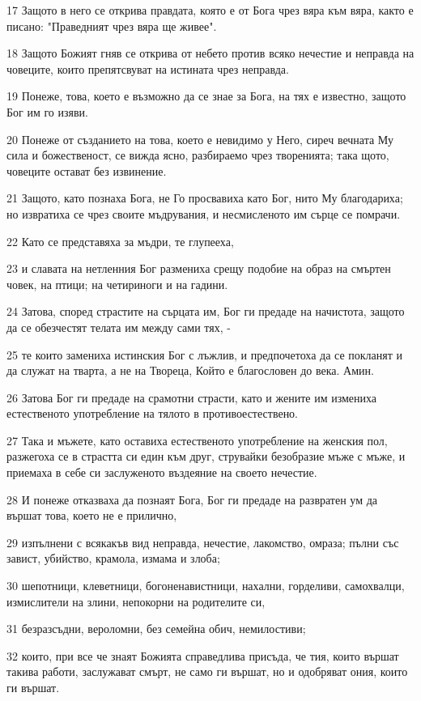 \par 17 Защото в него се открива правдата, която е от Бога чрез вяра към вяра, както е писано: "Праведният чрез вяра ще живее".
\par 18 Защото Божият гняв се открива от небето против всяко нечестие и неправда на човеците, които препятсвуват на истината чрез неправда.
\par 19 Понеже, това, което е възможно да се знае за Бога, на тях е известно, защото Бог им го изяви.
\par 20 Понеже от създанието на това, което е невидимо у Него, сиреч вечната Му сила и божественост, се вижда ясно, разбираемо чрез творенията; така щото, човеците остават без извинение.
\par 21 Защото, като познаха Бога, не Го просвавиха като Бог, нито Му благодариха; но извратиха се чрез своите мъдрувания, и несмисленото им сърце се помрачи.
\par 22 Като се представяха за мъдри, те глупееха,
\par 23 и славата на нетленния Бог размениха срещу подобие на образ на смъртен човек, на птици; на четириноги и на гадини.
\par 24 Затова, според страстите на сърцата им, Бог ги предаде на начистота, защото да се обезчестят телата им между сами тях, -
\par 25 те които замениха истинския Бог с лъжлив, и предпочетоха да се покланят и да служат на тварта, а не на Твореца, Който е благословен до века. Амин.
\par 26 Затова Бог ги предаде на срамотни страсти, като и жените им измениха естественото употребление на тялото в противоестествено.
\par 27 Така и мъжете, като оставиха естественото употребление на женския пол, разжегоха се в страстта си един към друг, струвайки безобразие мъже с мъже, и приемаха в себе си заслуженото въздеяние на своето нечестие.
\par 28 И понеже отказваха да познаят Бога, Бог ги предаде на развратен ум да вършат това, което не е прилично,
\par 29 изпълнени с всякакъв вид неправда, нечестие, лакомство, омраза; пълни със завист, убийство, крамола, измама и злоба;
\par 30 шепотници, клеветници, богоненавистници, нахални, горделиви, самохвалци, измислители на злини, непокорни на родителите си,
\par 31 безразсъдни, вероломни, без семейна обич, немилостиви;
\par 32 които, при все че знаят Божията справедлива присъда, че тия, които вършат такива работи, заслужават смърт, не само ги вършат, но и одобряват ония, които ги вършат.

